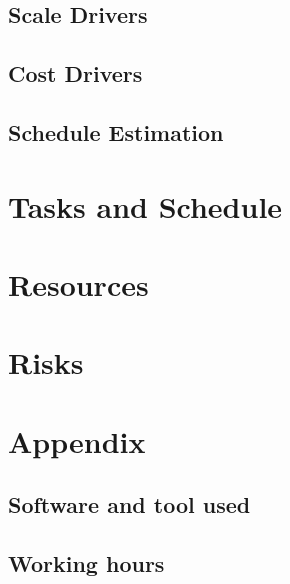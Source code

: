 \documentclass[]{report}
\begin{document}
	\section{Scale Drivers}
	
	
	\section{Cost Drivers}
	
	
	\section{Schedule Estimation}
	

\chapter{Tasks and Schedule}
	

\chapter{Resources}
	

\chapter{Risks}
	
	
\appendix

\chapter{Appendix}

	\section{Software and tool used}
	

	\section{Working hours}
	
\end{document}
